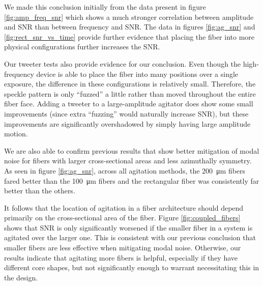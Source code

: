 \documentclass[twocolumn]{emulateapj}
\begin{document}
We made this conclusion initially from the data present in figure \ref{fig:amp_freq_snr} which shows a much stronger correlation between amplitude and SNR than between frequency and SNR. The data in figures \ref{fig:ag_snr} and \ref{fig:rect_snr_vs_time} provide further evidence that placing the fiber into more physical configurations further increases the SNR.

Our tweeter tests also provide evidence for our conclusion. Even though the high-frequency device is able to place the fiber into many positions over a single exposure, the difference in these configurations is relatively small. Therefore, the speckle pattern is only ``fuzzed'' a little rather than moved throughout the entire fiber face. Adding a tweeter to a large-amplitude agitator does show some small improvements (since extra ``fuzzing'' would naturally increase SNR), but these improvements are significantly overshadowed by simply having large amplitude motion.


We are also able to confirm previous results that show better mitigation of modal noise for fibers with larger cross-sectional areas and less azimuthally symmetry. As seen in figure \ref{fig:ag_snr}, across all agitation methods, the \SI{200}{\micro\meter} fibers fared better than the \SI{100}{\micro\meter} fibers and the rectangular fiber was consistently far better than the others.

It follows that the location of agitation in a fiber architecture should depend primarily on the cross-sectional area of the fiber. Figure \ref{fig:coupled_fibers} shows that SNR is only significantly worsened if the smaller fiber in a system is agitated over the larger one. This is consistent with our previous conclusion that smaller fibers are less effective when mitigating modal noise. Otherwise, our results indicate that agitating more fibers is helpful, especially if they have different core shapes, but not significantly enough to warrant necessitating this in the design.
\end{document}
